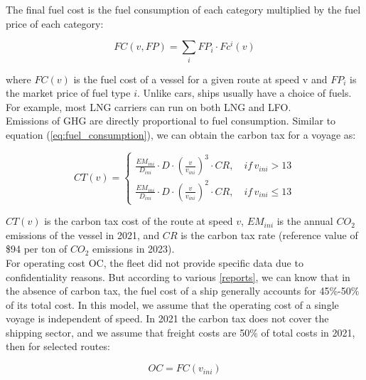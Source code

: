 \documentclass[a4paper,12pt]{article}
\begin{document}
The final fuel cost is the fuel consumption of each category multiplied by the fuel price of each category:

\begin{equation}
	\label{eq:fuel_cost}
	FC(v, FP) = \sum_i FP_i \cdot Fc^i(v)
\end{equation}

where $FC(v)$ is the fuel cost of a vessel for a given route at speed v and $FP_i$ is the market price of fuel type $i$. Unlike cars, ships usually have a choice of fuels. For example, most LNG carriers can run on both LNG and LFO.\\

Emissions of GHG are directly proportional to fuel consumption.
Similar to equation (\ref{eq:fuel_consumption}), we can obtain the carbon tax for a voyage as:

\begin{equation}
	\label{eq:emission}
	CT(v) =
	\left\{
	\begin{aligned}
		\frac{EM_{ini}}{D_{ini}} \cdot D \cdot (\frac{v}{v_{ini}})^3 \cdot CR, \quad if \, v_{ini} > 13 \\
		\frac{EM_{ini}}{D_{ini}} \cdot D \cdot (\frac{v}{v_{ini}})^2 \cdot CR, \quad if \, v_{ini} \leq 13
	\end{aligned}
	\right.
\end{equation}

$CT(v)$ is the carbon tax cost of the route at speed $v$, $EM_{ini}$ is the annual $CO_2$ emissions of the vessel in 2021, and $CR$ is the carbon tax rate (reference value of \$94 per ton of $CO_2$ emissions in 2023).\\

For operating cost OC, the fleet did not provide specific data due to confidentiality reasons.
But according to various \href{https://transportgeography.org/contents/chapter5/maritime-transportation/containerships-operating-costs-panamax-post-panamax/}{[reports]}, we can know that in the absence of carbon tax, the fuel cost of a ship generally accounts for 45\%-50\% of its total cost.
In this model, we assume that the operating cost of a single voyage is independent of speed.
In 2021 the carbon tax does not cover the shipping sector, and we assume that freight costs are 50\% of total costs in 2021, then for selected routes:

\begin{equation}
	\label{eq:operation_cost}
	OC = FC(v_{ini})
\end{equation}
\end{document}
